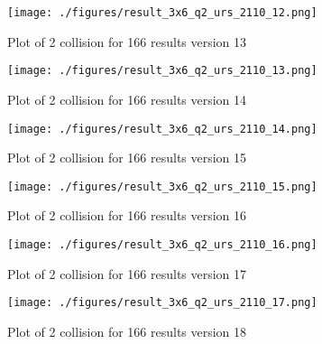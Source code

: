 \begin{figure}[!htb]
    \centering
    \texttt{[image: ./figures/result\_3x6\_q2\_urs\_2110\_12.png]}
    \caption{Plot of 2 collision for 166 results version 13}
    \label{fig:67_v0}
\end{figure}

\begin{figure}[!htb]
    \centering
    \texttt{[image: ./figures/result\_3x6\_q2\_urs\_2110\_13.png]}
    \caption{Plot of 2 collision for 166 results version 14}
    \label{fig:67_v0}
\end{figure}

\begin{figure}[!htb]
    \centering
    \texttt{[image: ./figures/result\_3x6\_q2\_urs\_2110\_14.png]}
    \caption{Plot of 2 collision for 166 results version 15}
    \label{fig:67_v0}
\end{figure}

\begin{figure}[!htb]
    \centering
    \texttt{[image: ./figures/result\_3x6\_q2\_urs\_2110\_15.png]}
    \caption{Plot of 2 collision for 166 results version 16}
    \label{fig:67_v0}
\end{figure}

\begin{figure}[!htb]
    \centering
    \texttt{[image: ./figures/result\_3x6\_q2\_urs\_2110\_16.png]}
    \caption{Plot of 2 collision for 166 results version 17}
    \label{fig:67_v0}
\end{figure}

\begin{figure}[!htb]
    \centering
    \texttt{[image: ./figures/result\_3x6\_q2\_urs\_2110\_17.png]}
    \caption{Plot of 2 collision for 166 results version 18}
    \label{fig:67_v0}
\end{figure}